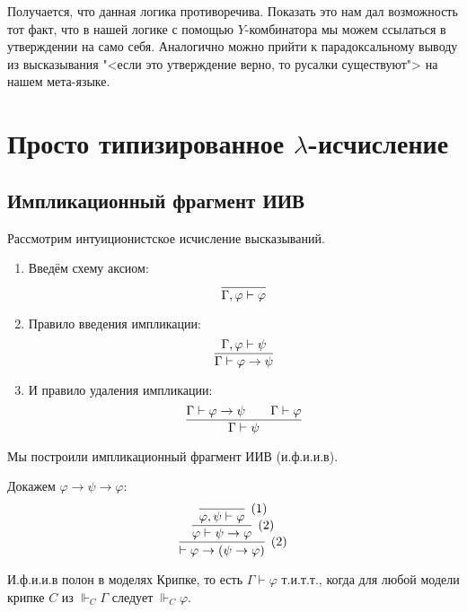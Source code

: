 Получается, что данная логика противоречива. Показать это нам дал возможность тот факт,
что в нашей логике с помощью $Y$-комбинатора мы можем ссылаться в утверждении на само себя.
Аналогично можно прийти к парадоксальному выводу из высказывания "<если это утверждение верно, то русалки существуют"> на нашем мета-языке.

\section{\texorpdfstring{Просто типизированное $\lambda$-исчисление}{Simply typed lambda calculus}}

\subsection{\texorpdfstring{Импликационный фрагмент ИИВ}{Implication fragment of intuitionistic logic}}

\begin{definition}
    Рассмотрим интуиционистское исчисление высказываний.
    \begin{enumerate}
        \item Введём схему аксиом:
        \[
            \infer{\Gamma, \varphi \vdash \varphi}{}
        \]
        \item Правило введения импликации:
        \[
            \infer{\Gamma \vdash \varphi \rightarrow \psi}{\Gamma, \varphi \vdash \psi}
        \]
        \item И правило удаления импликации:
        \[
            \infer{\Gamma \vdash \psi}{\Gamma \vdash \varphi \rightarrow \psi && \Gamma \vdash \varphi}
        \]
    \end{enumerate}

    Мы построили импликационный фрагмент ИИВ (и.ф.и.и.в).
\end{definition}

\begin{example} Докажем $\varphi \rightarrow \psi \rightarrow \varphi$:
\[
    \infer[(2)]
        { \vdash \varphi \rightarrow (\psi \rightarrow \varphi) }
        { \infer[(2)]
            { \varphi \vdash \psi \rightarrow \varphi }
            { \infer[(1)]
                { \varphi, \psi \vdash \varphi}
                {}
            }
        }
\]
\end{example}

\begin{theorem}
    И.ф.и.и.в полон в моделях Крипке, то есть $\Gamma \vdash \varphi$ т.и.т.т.,
    когда для любой модели крипке $C$ из $\Vdash_C \Gamma$ следует $\Vdash_C \varphi$.
\end{theorem}

